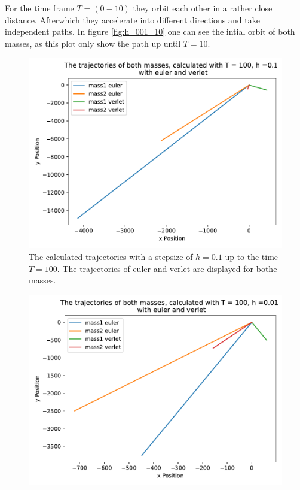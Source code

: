 \begin{itemize}
    For the time frame $T=(0-10)$ they orbit each other in a rather close distance.
    Afterwhich they accelerate into different directions and take independent paths.
    In figure \autoref{fig:h_001_10} one can see the intial orbit of both masses, as this plot only show the path up until $T=10$.
    \begin{figure}
        \centering
        \includegraphics[width=\textwidth]{plots/plotsT_100_01/plota.pdf}
        \caption{The calculated trajectories with a stepsize of $h=0.1$ up to the time $T=100$.
        The trajectories of euler and verlet are displayed for bothe masses.}
        \label{fig:h_01_100}
    \end{figure}
    \begin{figure}
        \centering
        \includegraphics[width=\textwidth]{plots/plotsT_100_h_001/plota.pdf}

\end{figure}
\end{itemize}
